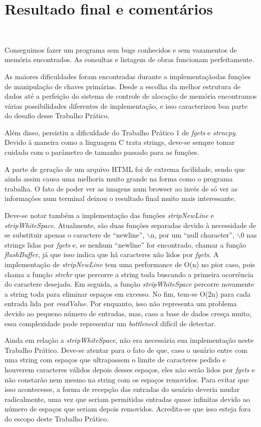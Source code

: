 \documentclass{article}
\begin{document}
\section{Resultado final e comentários}\

Conseguimos fazer um programa sem bugs conhecidos e sem vazamentos de memória encontrados. As consultas e listagem de obras funcionam perfeitamente.

As maiores dificuldades foram encontradas durante a implementaçãodas funções de manipulação de chaves primárias. Desde a escolha da melhor estrutura de dados até a perfeição do sistema de controle de alocação de memória encontramos várias possibilidades diferentes de implementação, e isso caracterizou boa parte do desafio desse Trabalho Prático.

Além disso, persistiu a dificuldade do Trabalho Prático 1 de \textit{fgets} e \textit{strncpy}. Devido à maneira como a linguagem C trata strings, deve-se sempre tomar cuidado com o parâmetro de tamanho passado para as funções.

A parte de geração de um arquivo HTML foi de extrema facilidade, sendo que ainda assim causa uma melhoria muito grande na forma como o programa trabalha. O fato de poder ver as imagens num browser ao invés de só ver as informações num terminal deixou o resultado final muito mais interessante.

Deve-se notar também a implementação das funções \textit{stripNewLine} e \textit{stripWhiteSpace}. Atualmente, são duas funções separadas devido à necessidade de se substituir apenas o caractere de ``newline'', $\backslash$n, por um ``null character'', $\backslash$0 nas strings lidas por \textit{fgets} e, se nenhum ``newline'' for encontrado, chamar a função \textit{flushBuffer}, já que isso indica que há caracteres não lidos por \textit{fgets}. A implementação de \textit{stripNewLine} tem uma performance de O(n) no pior caso, pois chama a função \textit{strchr} que percorre a string toda buscando a primeira ocorrência do caractere desejado. Em seguida, a função \textit{stripWhiteSpace} percorre novamente a string toda para eliminar espaços em excesso. No fim, tem-se O(2n) para cada entrada lida por \textit{readValue}. Por enquanto, isso não representa um problema devido ao pequeno número de entradas, mas, caso a base de dados cresça muito, essa complexidade pode representar um \textit{bottleneck} difícil de detectar.

Ainda em relação a \textit{stripWhiteSpace}, não era necessária sua implementação neste Trabalho Prático. Deve-se atentar para o fato de que, caso o usuário entre com uma string com espaços que ultrapassem o limite de caracteres pedido e houverem caracteres válidos depois desses espaços, eles não serão lidos por \textit{fgets} e não constarão nem mesmo na string com os espaços removidos. Para evitar que isso acontecesse, a forma de recepção das entradas do usuário deveria mudar radicalmente, uma vez que seriam permitidas entradas quase infinitas devido ao número de espaços que seriam depois removidos. Acredita-se que isso esteja fora do escopo deste Trabalho Prático.
\end{document}

